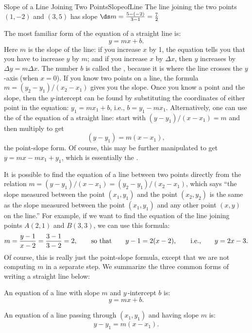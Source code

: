 \bigskip

\begin{example}{Slope of a Line Joining Two Points}{SlopeofLine}
The line joining the two points $(1,-2)$ and $(3,5)$ has slope
$\ds m=\frac{5-(-2)}{3-1}=\frac{7}{2}$
\end{example}

The most familiar form of the equation of a straight line is:
$$y=mx+b.$$
Here $m$ is the slope of the line: if you increase $x$ by
1, the equation tells you that you have to increase $y$ by $m$; and if
you increase $x$ by $\Delta x$, then $y$ increases by $\Delta
y=m\Delta x$.  The number $b$ is called the , because
it is where the line crosses the $y$-axis (when $x=0$).  If you know two points on
a line, the formula $m=(y_2-y_1)/(x_2-x_1)$ gives you the slope.
Once you know a point and the slope, then the $y$-intercept can be
found by substituting the coordinates of either point in the equation:
$y_1=mx_1+b$, i.e., $b=y_1-mx_1$.  Alternatively, one can use the
 of the equation of a straight line: start with
$(y-y_1)/(x-x_1)=m$ and then multiply to get 
$$(y-y_1)=m(x-x_1),$$ the
point-slope form. Of course, this may be further manipulated to get
$y=mx-mx_1+y_1$, which is essentially the .

It is possible to find the equation of a line between two points directly
from the relation $m=(y-y_1)/(x-x_1)=(y_2-y_1)/(x_2-x_1)$, which says ``the
slope measured between the point $(x_1,y_1)$ and the point $(x_2,y_2)$ is
the same as the slope measured between the point $(x_1,y_1)$ and any other
point $(x,y)$ on the line.''  For example, if we want to find the equation
of the line joining points $A(2,1)$ and $B(3,3)$, we can use
this formula:
$$
m=\frac{y-1}{x-2}=\frac{3-1}{3-2}=2,\qquad\hbox{so~that}\qquad
y-1=2(x-2),\qquad\hbox{i.e.,}\qquad y=2x-3.
$$
Of course, this is really just the point-slope formula, except that we
are not computing $m$ in a separate step. 
We summarize the three common forms of writing a straight line below:\\

\begin{formulabox}
An equation of a line with slope $m$ and $y\, $-intercept $b$ is:
$$y=mx+b.$$
\end{formulabox}

\bigskip

\begin{formulabox}
An equation of a line passing through $(x_1,y_1)$ and having slope $m$ is:
$$y-y_1=m(x-x_1).$$
\end{formulabox}

